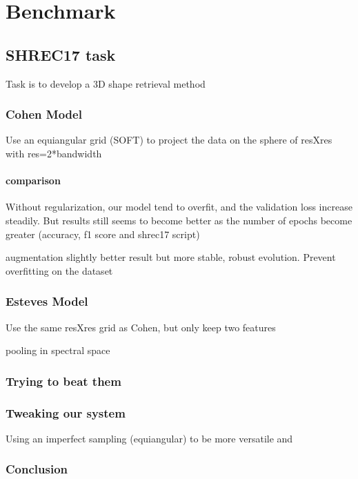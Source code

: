 \documentclass[11pt]{report}
\begin{document}
\chapter{Benchmark}
\section{SHREC17 task}
Task is to develop a 3D shape retrieval method
\subsection{Cohen Model}
Use an equiangular grid (SOFT) to project the data on the sphere of resXres with res=2*bandwidth

\subsubsection{comparison}
Without regularization, our model tend to overfit, and the validation loss increase steadily. But results still seems to become better as the number of epochs become greater (accuracy, f1 score and shrec17 script)

augmentation slightly better result but more stable, robust evolution. Prevent overfitting on the dataset
\subsection{Esteves Model}
Use the same resXres grid as Cohen, but only keep two features

pooling in spectral space
\subsection{Trying to beat them}
\subsection{Tweaking our system}
Using an imperfect sampling (equiangular) to be more versatile and 
\subsection{Conclusion}
\end{document}
